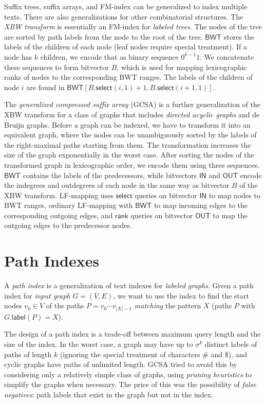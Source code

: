 \documentclass[a4paper,UKenglish]{lipics-v2016}
\newcommand{\abs}[1]{\ensuremath{\lvert #1 \rvert}}
\newcommand{\rank}{\ensuremath{\mathsf{rank}}}
\newcommand{\select}{\ensuremath{\mathsf{select}}}
\newcommand{\glabel}{\ensuremath{\mathsf{label}}}
\newcommand{\LFmapping}{LF\nobreakdash-mapping}
\newcommand{\FMindex}{FM\nobreakdash-index}
\newcommand{\BWT}{\ensuremath{\mathsf{BWT}}}
\newcommand{\bvIN}{\ensuremath{\mathsf{IN}}}
\newcommand{\bvOUT}{\ensuremath{\mathsf{OUT}}}
\begin{document}
Suffix trees, suffix arrays, and \FMindex{} can be generalized to index multiple texts. There are also generalizations for other combinatorial structures. The \emph{XBW transform} \cite{Ferragina2009b} is essentially an \FMindex{} for \emph{labeled trees}. The nodes of the tree are sorted by path labels from the node to the root of the tree. $\BWT$ stores the labels of the children of each node (leaf nodes require special treatment). If a node has $k$ children, we encode that as binary sequence $0^{k-1} 1$. We concatenate these sequences to form bitvector $B$, which is used for mapping lexicographic ranks of nodes to the corresponding BWT ranges. The labels of the children of node $i$ are found in $\BWT[B.\select(i, 1) + 1, B.\select(i + 1, 1)]$.

The \emph{generalized compressed suffix array} (GCSA) \cite{Siren2014} is a further generalization of the XBW transform for a class of graphs that includes \emph{directed acyclic graphs} and de Bruijn graphs. Before a graph can be indexed, we have to transform it into an equivalent graph, where the nodes can be unambiguously sorted by the labels of the right-maximal paths starting from them. The transformation increases the size of the graph exponentially in the worst case. After sorting the nodes of the transformed graph in lexicographic order, we encode them using three sequences. $\BWT$ contains the labels of the predecessors, while bitvectors $\bvIN$ and $\bvOUT$ encode the indegrees and outdegrees of each node in the same way as bitvector $B$ of the XBW transform. \LFmapping{} uses $\select$ queries on bitvector $\bvIN$ to map nodes to BWT ranges, ordinary \LFmapping{} with $\BWT$ to map incoming edges to the corresponding outgoing edges, and $\rank$ queries on bitvector $\bvOUT$ to map the outgoing edges to the predecessor nodes.


\section{Path Indexes}\label{sect:path-indexes}

A \emph{path index} is a generalization of text indexes for \emph{labeled graphs}. Given a path index for \emph{input graph} $G = (V, E)$, we want to use the index to find the start nodes $v_{0} \in V$ of the paths $P = v_{0} \dotsm v_{\abs{X}-1}$ \emph{matching} the pattern $X$ (paths $P$ with $G.\glabel(P) = X$).

The design of a path index is a trade-off between maximum query length and the size of the index. In the worst case, a graph may have up to $\sigma^{k}$ distinct labels of paths of length $k$ (ignoring the special treatment of characters $\#$ and $\$$), and cyclic graphs have paths of unlimited length. GCSA \cite{Siren2014} tried to avoid this by considering only a relatively simple class of graphs, using \emph{pruning heuristics} to simplify the graphs when necessary. The price of this was the possibility of \emph{false negatives}: path labels that exist in the graph but not in the index.
\end{document}
